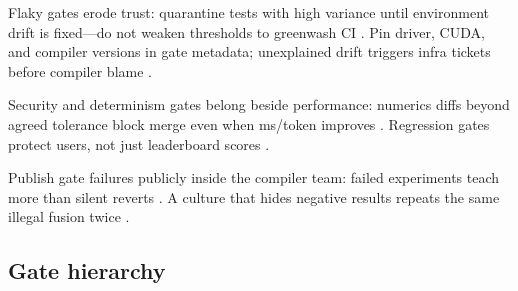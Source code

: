 Flaky gates erode trust: quarantine tests with high variance until environment drift is fixed---do not weaken thresholds to greenwash CI \citep{patel2025llminference,yirage2026,chen2020compilerbasedhardw,memoryfloor2026,taxbreak2026,kwon2023vllm,liu2024deepseekv3,amd2024aie,dlbook,semianalysis2024tma,amd2024xdna,dao2022flashattention,dao2023flashdecoding,nvidia2024cudagraphs,nvidia2022hopper}. Pin driver, CUDA, and compiler versions in gate metadata; unexplained drift triggers infra tickets before compiler blame \citep{nvidia2022hopper,nvidia2024cudagraphs,yirage2026,chen2020compilerbasedhardw,patel2025llminference,memoryfloor2026,taxbreak2026,kwon2023vllm,liu2024deepseekv3,amd2024aie,dlbook,semianalysis2024tma,amd2024xdna,dao2022flashattention,dao2023flashdecoding,amd2024xdna}.

Security and determinism gates belong beside performance: numerics diffs beyond agreed tolerance block merge even when ms/token improves \citep{chen2020compilerbasedhardw,yirage2026,patel2025llminference,kwon2023vllm,liu2024deepseekv3,memoryfloor2026,taxbreak2026,amd2024aie,dlbook,semianalysis2024tma,amd2024xdna,dao2022flashattention,dao2023flashdecoding,nvidia2024cudagraphs,nvidia2022hopper}. Regression gates protect users, not just leaderboard scores \citep{patel2025llminference,yirage2026,chen2020compilerbasedhardw,memoryfloor2026,taxbreak2026,kwon2023vllm,liu2024deepseekv3,amd2024aie,dlbook,semianalysis2024tma,amd2024xdna,dao2022flashattention,dao2023flashdecoding,nvidia2024cudagraphs,nvidia2022hopper}.

Publish gate failures publicly inside the compiler team: failed experiments teach more than silent reverts \citep{chen2020compilerbasedhardw,yirage2026,patel2025llminference,memoryfloor2026,taxbreak2026,kwon2023vllm,liu2024deepseekv3,amd2024aie,dlbook,semianalysis2024tma,amd2024xdna,dao2022flashattention,dao2023flashdecoding,nvidia2024cudagraphs,nvidia2022hopper}. A culture that hides negative results repeats the same illegal fusion twice \citep{yirage2026,chen2020compilerbasedhardw,patel2025llminference,memoryfloor2026,taxbreak2026,amd2024aie,dlbook,kwon2023vllm,liu2024deepseekv3,semianalysis2024tma,amd2024xdna,dao2022flashattention,dao2023flashdecoding,nvidia2024cudagraphs,nvidia2022hopper}.

\subsection{Gate hierarchy}

